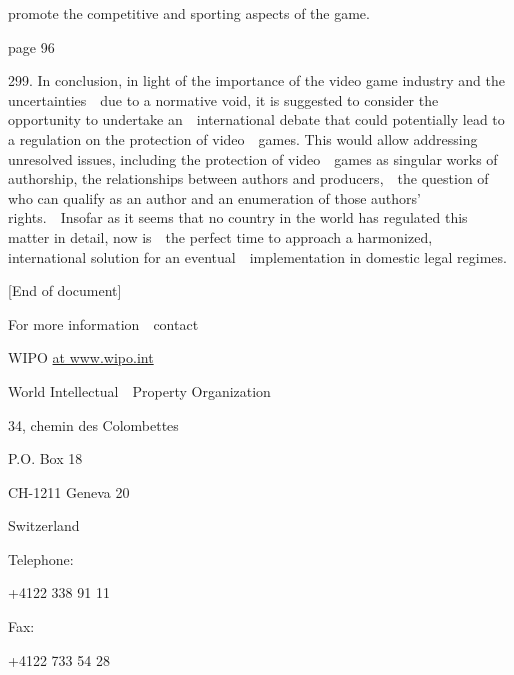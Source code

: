 \documentclass[
]{article}
\begin{document}
{promote the competitive and sporting aspects of the game.}

{page 96}

{299. }{In conclusion, in light of the importance of the video game
industry and the uncertainties~~due to a normative void, it is suggested
to consider the opportunity to undertake an~~international debate that
could potentially lead to a regulation on the protection of
video~~games. This would allow addressing unresolved issues, including
the protection of video~~games as singular works of authorship, the
relationships between authors and producers,~~t}{he question of who can
qualify as an author and an enumeration of those authors'
rights}{.~~Insofar as it seems that no country in the world has
regulated this matter in detail, now is~~the perfect time to approach a
harmonized, international solution for an eventual~~implementation in
domestic legal regimes.}

{{[}End of document{]}}

{For more information~~contact}

{WIPO }\href{http://www.wipo.int}{{at www.wipo.int}}

{World Intellectual~~Property Organization}

{34, chemin des Colombettes}

{P.O. Box 18}

{CH-1211 Geneva 20}

{Switzerland}

{Telephone:}

{+4122 338 91 11}

{Fax:}

{+4122 733 54 28}
\end{document}
